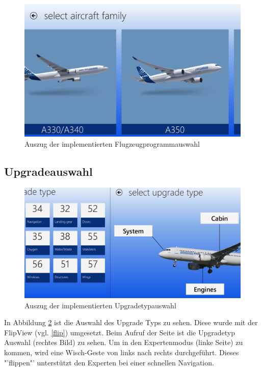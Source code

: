 \begin{figure}[H]
\centering
\includegraphics[width=\hsize]{images/impl/select_aircraft_family_impl}
\caption{Auszug der implementierten Flugzeugprogrammauswahl}
\label{aircraftProgrammImpl}
\end{figure}

\subsection{Upgradeauswahl}
\begin{figure}[H]
\centering
\includegraphics[width=\hsize]{images/impl/select_upgrade_type_impl}
\caption{Auszug der implementierten Upgradetypauswahl}
\label{upgradeTypeSelectionImpl}
\end{figure}
In Abbildung \ref{upgradeTypeSelectionImpl} ist die Auswahl des Upgrade Typs zu sehen. Diese wurde mit der FlipView (vgl. \ref{flip}) umgesetzt. Beim Aufruf der Seite ist die Upgradetyp Auswahl (rechtes Bild) zu sehen.  Um in den Expertenmodus (linke Seite) zu kommen, wird eine Wisch-Geste von links nach rechts durchgeführt. Dieses "'flippen"' unterstützt den Experten bei einer schnellen Navigation.


